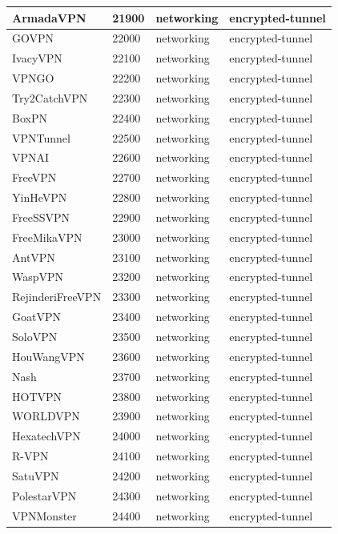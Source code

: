 \begin{longtable}{p{}|p{}|p{}|p{}}
    ArmadaVPN &	21900 &	networking &	encrypted-tunnel \\ \hline
    GOVPN &	22000 &	networking &	encrypted-tunnel \\ \hline
    IvacyVPN &	22100 &	networking &	encrypted-tunnel \\ \hline
    VPNGO &	22200 &	networking &	encrypted-tunnel \\ \hline
    Try2CatchVPN &	22300 &	networking &	encrypted-tunnel \\ \hline
    BoxPN &	22400 &	networking &	encrypted-tunnel \\ \hline
    VPNTunnel &	22500 &	networking &	encrypted-tunnel \\ \hline
    VPNAI &	22600 &	networking &	encrypted-tunnel \\ \hline
    FreeVPN &	22700 &	networking &	encrypted-tunnel \\ \hline
    YinHeVPN &	22800 &	networking &	encrypted-tunnel \\ \hline
    FreeSSVPN &	22900 &	networking &	encrypted-tunnel \\ \hline
    FreeMikaVPN &	23000 &	networking &	encrypted-tunnel \\ \hline
    AntVPN &	23100 &	networking &	encrypted-tunnel \\ \hline
    WaspVPN &	23200 &	networking &	encrypted-tunnel \\ \hline
    RejinderiFreeVPN &	23300 &	networking &	encrypted-tunnel \\ \hline
    GoatVPN &	23400 &	networking &	encrypted-tunnel \\ \hline
    SoloVPN &	23500 &	networking &	encrypted-tunnel \\ \hline
    HouWangVPN &	23600 &	networking &	encrypted-tunnel \\ \hline
    Nash &	23700 &	networking &	encrypted-tunnel \\ \hline
    HOTVPN &	23800 &	networking &	encrypted-tunnel \\ \hline
    WORLDVPN &	23900 &	networking &	encrypted-tunnel \\ \hline
    HexatechVPN &	24000 &	networking &	encrypted-tunnel \\ \hline
    R-VPN &	24100 &	networking &	encrypted-tunnel \\ \hline
    SatuVPN &	24200 &	networking &	encrypted-tunnel \\ \hline
    PolestarVPN &	24300 &	networking &	encrypted-tunnel \\ \hline
    VPNMonster &	24400 &	networking &	encrypted-tunnel \\ \hline

\end{longtable}
